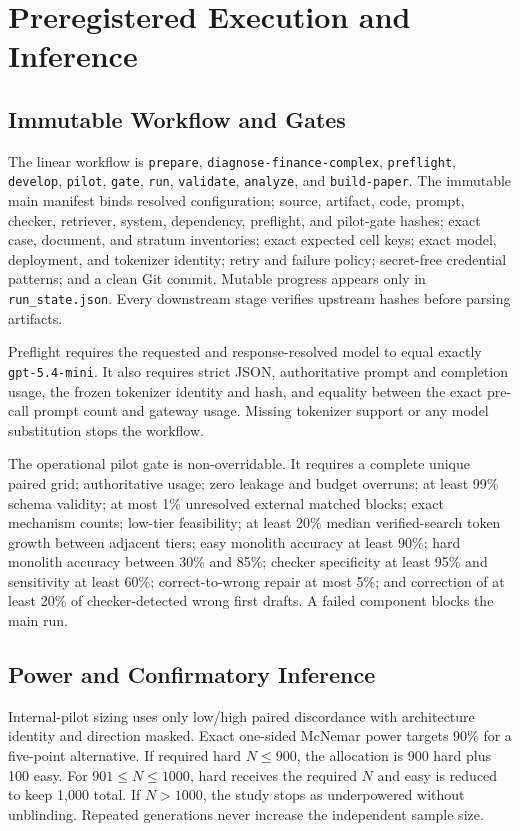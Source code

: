 \section{Preregistered Execution and Inference}

\subsection{Immutable Workflow and Gates}

The linear workflow is \texttt{prepare},
\texttt{diagnose-finance-complex}, \texttt{preflight}, \texttt{develop},
\texttt{pilot}, \texttt{gate}, \texttt{run}, \texttt{validate},
\texttt{analyze}, and \texttt{build-paper}. The immutable main manifest binds
resolved configuration; source, artifact, code, prompt, checker, retriever,
system, dependency, preflight, and pilot-gate hashes; exact case, document, and
stratum inventories; exact expected cell keys; exact model, deployment, and
tokenizer identity; retry and failure policy; secret-free credential patterns;
and a clean Git commit. Mutable progress appears only in
\texttt{run\_state.json}. Every downstream stage verifies upstream hashes before
parsing artifacts.

Preflight requires the requested and response-resolved model to equal exactly
\texttt{gpt-5.4-mini}. It also requires strict JSON, authoritative prompt and
completion usage, the frozen tokenizer identity and hash, and equality between
the exact pre-call prompt count and gateway usage. Missing tokenizer support or
any model substitution stops the workflow.

The operational pilot gate is non-overridable. It requires a complete unique
paired grid; authoritative usage; zero leakage and budget overruns; at least
99\% schema validity; at most 1\% unresolved external matched blocks; exact
mechanism counts; low-tier feasibility; at least 20\% median verified-search
token growth between adjacent tiers; easy monolith accuracy at least 90\%; hard
monolith accuracy between 30\% and 85\%; checker specificity at least 95\% and
sensitivity at least 60\%; correct-to-wrong repair at most 5\%; and correction
of at least 20\% of checker-detected wrong first drafts. A failed component
blocks the main run.

\subsection{Power and Confirmatory Inference}

Internal-pilot sizing uses only low/high paired discordance with architecture
identity and direction masked. Exact one-sided McNemar power targets 90\% for a
five-point alternative. If required hard $N\le900$, the allocation is 900 hard
plus 100 easy. For $901\le N\le1000$, hard receives the required $N$ and easy is
reduced to keep 1,000 total. If $N>1000$, the study stops as underpowered without
unblinding. Repeated generations never increase the independent sample size.

